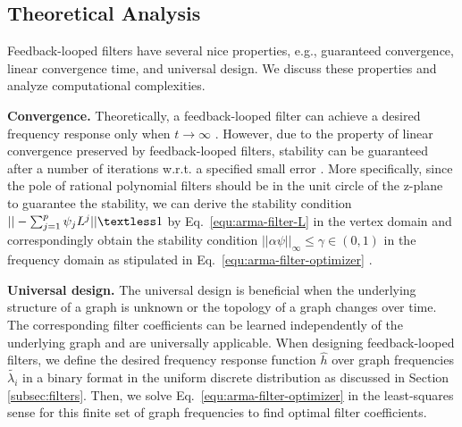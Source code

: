 \documentclass{article}
\begin{document}
\begin{comment}
\begin{figure}[h]
    \centering
    \texttt{[image: images/first\_model\_v5.png]}
    \caption{Densely connected spectral ARMA convnets architecture with 3 ARMA layers (8, 16, 32 nodes respectively) followed by a softmax layer.}
    \label{fig:firstModel}
\end{figure}
\end{comment}

\subsection{Theoretical Analysis}\label{subsec:theoretical-properties}
Feedback-looped filters have several nice properties, e.g., guaranteed convergence, linear convergence time, and universal design. We discuss these properties and analyze computational complexities.  

\noindent\textbf{Convergence. } Theoretically, a feedback-looped filter can achieve a desired frequency response only when $t\rightarrow \infty$ \cite{isufi2017autoregressive1}. However, due to the property of linear convergence preserved by feedback-looped filters, stability can be guaranteed after a number of iterations w.r.t. a specified small error \cite{isufi2017autoregressive2}. More specifically, since the pole of rational polynomial filters should be in the unit circle of the z-plane to guarantee the stability, we can derive the stability condition $||-\sum_{j=1}^{p} \psi_j L^j|| \textless 1$ by  Eq.~\ref{equ:arma-filter-L} in the vertex domain and correspondingly obtain the stability condition $||\alpha\psi||_\infty \le \gamma \in (0, 1)$ in the frequency domain as stipulated in Eq.~\ref{equ:arma-filter-optimizer} \cite{isufi2017autoregressive2}.








\noindent\textbf{Universal design. } 
The universal design is beneficial when the underlying structure of a graph is unknown or the topology of a graph changes over time. The corresponding filter coefficients can be learned independently of the underlying graph and are universally applicable. When designing feedback-looped filters, we define the desired frequency response function $\hat{h}$ over graph frequencies $\tilde{\lambda_i}$ in a binary format in the uniform discrete distribution as discussed in Section \ref{subsec:filters}. Then, we solve Eq.~\ref{equ:arma-filter-optimizer} in the least-squares sense for this finite set of graph frequencies to find optimal filter coefficients.
\end{document}
